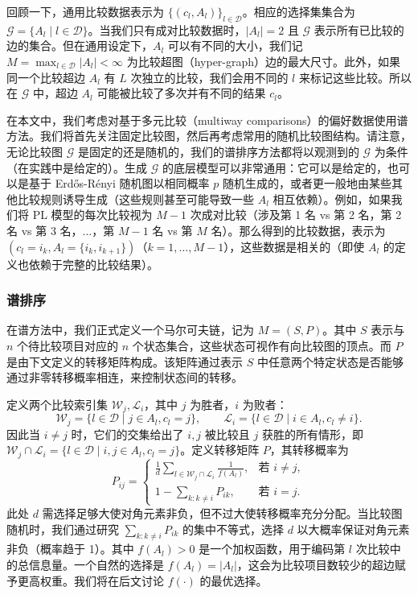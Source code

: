 回顾一下，通用比较数据表示为 $\{(c_{l},A_{l})\}_{l\in \mathcal{D}}$。相应的选择集集合为 $\mathcal{G} = \{A_{l}\mid l\in \mathcal{D}\}$。当我们只有成对比较数据时，$|A_{l}| = 2$ 且 $\mathcal{G}$ 表示所有已比较的边的集合。但在通用设定下，$A_{l}$ 可以有不同的大小，我们记 $M = \max_{l\in \mathcal{D}}|A_{l}|< \infty$ 为比较超图（hyper-graph）边的最大尺寸。此外，如果同一个比较超边 $A_{l}$ 有 $L$ 次独立的比较，我们会用不同的 $l$ 来标记这些比较。所以在 $\mathcal{G}$ 中，超边 $A_{l}$ 可能被比较了多次并有不同的结果 $c_{l}$。

在本文中，我们考虑对基于多元比较（multiway comparisons）的偏好数据使用谱方法。我们将首先关注固定比较图，然后再考虑常用的随机比较图结构。请注意，无论比较图 $\mathcal{G}$ 是固定的还是随机的，我们的谱排序方法都将以观测到的 $\mathcal{G}$ 为条件（在实践中是给定的）。生成 $\mathcal{G}$ 的底层模型可以非常通用：它可以是给定的，也可以是基于 Erdős-Rényi 随机图以相同概率 $p$ 随机生成的，或者更一般地由某些其他比较规则诱导生成（这些规则甚至可能导致一些 $A_{l}$ 相互依赖）。例如，如果我们将 PL 模型的每次比较视为 $M - 1$ 次成对比较（涉及第 1 名 vs 第 2 名，第 2 名 vs 第 3 名，...，第 $M - 1$ 名 vs 第 $M$ 名）。那么得到的比较数据，表示为 $(c_{l} = i_{k},A_{l} = \{i_{k},i_{k + 1}\})$（$k = 1,\ldots ,M - 1$），这些数据是相关的（即使 $A_{l}$ 的定义也依赖于完整的比较结果）。


\subsubsection{谱排序}

在谱方法中，我们正式定义一个马尔可夫链，记为 $M = (S,P)$。其中 $S$ 表示与 $n$ 个待比较项目对应的 $n$ 个状态集合，这些状态可视作有向比较图的顶点。而 $P$ 是由下文定义的转移矩阵构成。该矩阵通过表示 $S$ 中任意两个特定状态是否能够通过非零转移概率相连，来控制状态间的转移。

定义两个比较索引集 $\mathcal{W}_{j},\mathcal{L}_{i}$，其中 $j$ 为胜者，$i$ 为败者：
$$
\mathcal{W}_{j} = \{l\in \mathcal{D}\mid j\in A_{l},c_{l} = j\} ,\qquad \mathcal{L}_{i} = \{l\in \mathcal{D}\mid i\in A_{l},c_{l}\neq i\} .
$$
因此当 $i\neq j$ 时，它们的交集给出了 $i,j$ 被比较且 $j$ 获胜的所有情形，即 $\mathcal{W}_{j}\cap \mathcal{L}_{i} = \{l\in \mathcal{D}\mid i,j\in A_{l},c_{l} = j\}$。定义转移矩阵 $P$，其转移概率为
$$
P_{ij} = \left\{ \begin{array}{ll}\frac{1}{d}\sum_{l\in \mathcal{W}_{j}\cap \mathcal{L}_{i}}\frac{1}{f(A_{l})}, & \text{若 } i\neq j, \\ 1 - \sum_{k:k\neq i}P_{ik}, & \text{若 } i = j. \end{array} \right.
$$
此处 $d$ 需选择足够大使对角元素非负，但不过大使转移概率充分分配。当比较图随机时，我们通过研究 $\sum_{k:k\neq i}P_{i k}$ 的集中不等式，选择 $d$ 以大概率保证对角元素非负（概率趋于 1）。其中 $f(A_{l}) > 0$ 是一个加权函数，用于编码第 $l$ 次比较中的总信息量。一个自然的选择是 $f(A_{l}) = |A_{l}|$，这会为比较项目数较少的超边赋予更高权重。我们将在后文讨论 $f(\cdot)$ 的最优选择。

